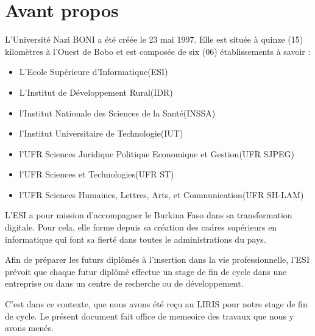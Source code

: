 {} {
\thispagestyle{front}



\chapter*{Avant propos}
L’Université Nazi BONI a été créée le 23 mai 1997. Elle est située à quinze
(15) kilomètres à l’Ouest de Bobo et est composée de six (06) établissements à savoir :
\begin{itemize}
  \item L'Ecole Supérieure d'Informatique(ESI)
  \item L'Institut de Développement Rural(IDR)
  \item l'Institut Nationale des Sciences de la Santé(INSSA)
  \item l'Institut Universitaire de Technologie(IUT)
  \item l'UFR Sciences Juridique Politique Economique et Gestion(UFR SJPEG)
  \item l'UFR Sciences et Technologies(UFR ST)
  \item l'UFR Sciences Humaines, Lettres, Arts, et Communication(UFR SH-LAM)
\end{itemize}

L'ESI a pour mission d'accompagner le Burkina Faso dans sa transformation
digitale. Pour cela, elle forme depuis sa création des cadres supérieurs en
informatique qui font sa fierté dans toutes le administrations du pays.

Afin de préparer les futurs diplômés à l’insertion dans la vie professionnelle,
l'ESI prévoit que chaque futur diplômé effectue un stage de fin de cycle
dans une entreprise ou dans un centre de recherche ou de développement.

C’est dans ce contexte, que nous avons été reçu au LIRIS pour notre stage de fin de cycle.
Le présent document fait office de memeoire des travaux que nous y avons menés.

\thispagestyle{front}
\vspace{0.5\linewidth}
\begin{flushright}
  \emph{}\\
  

\end{flushright}}
